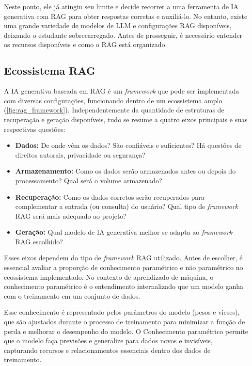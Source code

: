 \documentclass[a4paper, 12pt]{article}
\begin{document}
    Neste ponto, ele já atingiu seu limite e decide recorrer a uma ferramenta de IA generativa com RAG para obter respostas corretas e auxiliá-lo. No entanto, existe uma grande variedade de modelos de LLM e configurações RAG disponíveis, deixando o estudante sobrecarregado. Antes de prosseguir, é necessário entender os recursos disponíveis e como o RAG está organizado.

    \subsection{Ecossistema RAG}

    A IA generativa baseada em RAG é um \textit{framework} que pode ser implementada com diversas configurações, funcionando dentro de um ecossistema amplo (\autoref{fig:rag_framework}). Independentemente da quantidade de estruturas de recuperação e geração disponíveis, tudo se resume a quatro eixos principais e suas respectivas questões:
    
    \begin{itemize}
        \item \textbf{Dados:} De onde vêm os dados? São confiáveis e suficientes? Há questões de direitos autorais, privacidade ou segurança?
        \item \textbf{Armazenamento:} Como os dados serão armazenados antes ou depois do processamento? Qual será o volume armazenado?
        \item \textbf{Recuperação:} Como os dados corretos serão recuperados para complementar a entrada (ou consulta) do usuário? Qual tipo de \textit{framework} RAG será mais adequado ao projeto?
        \item \textbf{Geração:} Qual modelo de IA generativa melhor se adapta ao \textit{framework} RAG escolhido?
    \end{itemize} 

    Esses eixos dependem do tipo de \textit{framework} RAG utilizado. Antes de escolher, é essencial avaliar a proporção de conhecimento paramétrico e não paramétrico no ecossistema implementado. No contexto de aprendizado de máquina, o conhecimento paramétrico é o entendimento internalizado que um modelo ganha com o treinamento em um conjunto de dados. 
    
    Esse conhecimento é representado pelos parâmetros do modelo (pesos e vieses), que são ajustados durante o processo de treinamento para minimizar a função de perda e melhorar o desempenho do modelo. O Conhecimento paramétrico permite que o modelo faça previsões e generalize para dados novos e invisíveis, capturando recursos e relacionamentos essenciais dentro dos dados de treinamento.
    
\end{document}
